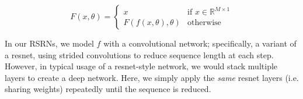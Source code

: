 \documentclass{article}
\newcommand{\real}{\mathbb{R}}
\begin{document}
\begin{equation}
    F(x, \theta) =
    \begin{cases}
        x &\text{if } x \in \real^{M \times 1} \\
        F(f(x, \theta), \theta) &\text{otherwise}
    \end{cases}
\end{equation}

In our RSRNs, we model $f$ with a convolutional network; specifically, a variant of a resnet, using strided convolutions to reduce sequence length at each step.
However, in typical usage of a resnet-style network, we would stack multiple layers to create a deep network.
Here, we simply apply the \emph{same} resnet layers (i.e. sharing weights) repeatedly until the sequence is reduced.
\end{document}
